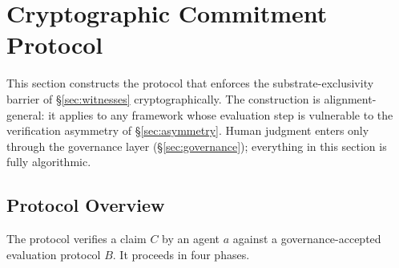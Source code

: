 \section{Cryptographic Commitment Protocol}
\label{sec:commitment}

This section constructs the protocol that enforces the substrate-exclusivity
barrier of \S\ref{sec:witnesses} cryptographically.  The construction is
alignment-general: it applies to any framework whose evaluation step is
vulnerable to the verification asymmetry of \S\ref{sec:asymmetry}.
Human judgment enters only through the governance layer
(\S\ref{sec:governance}); everything in this section is fully algorithmic.

\subsection{Protocol Overview}
\label{sec:protocol_overview}

The protocol verifies a claim $C$ by an agent $a$ against a
governance-accepted evaluation protocol $B$.  It proceeds in four
phases.

